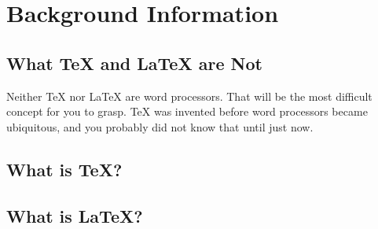 

\chapter{Background Information}

\section{What \TeX{} and \LaTeX{} are Not}
Neither \TeX{} nor \LaTeX{} are word processors. That will be the most
difficult concept for you to grasp. \TeX{} was invented before word
processors became ubiquitous, and you probably did not know that until 
just now. 

\section{What is \TeX?}
\lipsum[5-10]

\section{What is \LaTeX?}
\lipsum[8-12]

